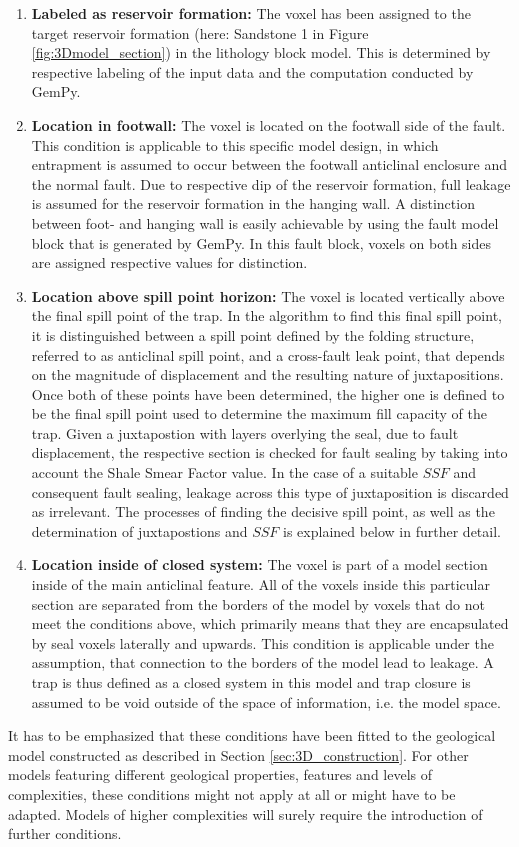 		\begin{enumerate}
			\item \textbf{Labeled as reservoir formation:} The voxel has been assigned to the target reservoir formation (here: Sandstone 1 in Figure \ref{fig:3Dmodel_section}) in the lithology block model. This is determined by respective labeling of the input data and the computation conducted by GemPy.
			\item \textbf{Location in footwall:} The voxel is located on the footwall side of the fault. This condition is applicable to this specific model design, in which entrapment is assumed to occur between the footwall anticlinal enclosure and the normal fault. Due to respective dip of the reservoir formation, full leakage is assumed for the reservoir formation in the hanging wall. A distinction between foot- and hanging wall is easily achievable by using the fault model block that is generated by GemPy. In this fault block, voxels on both sides are assigned respective values for distinction.
			\item \textbf{Location above spill point horizon:} The voxel is located vertically above the final spill point of the trap. In the algorithm to find this final spill point, it is distinguished between a spill point defined by the folding structure, referred to as anticlinal spill point, and a cross-fault leak point, that depends on the magnitude of displacement and the resulting nature of juxtapositions. Once both of these points have been determined, the higher one is defined to be the final spill point used to determine the maximum fill capacity of the trap.  Given a juxtapostion with layers overlying the seal, due to fault displacement, the respective section is checked for fault sealing by taking into account the Shale Smear Factor value. In the case of a suitable $SSF$ and consequent fault sealing, leakage across this type of juxtaposition is discarded as irrelevant. The processes of finding the decisive spill point, as well as the determination of juxtapostions and $SSF$ is explained below in further detail.
			\item \textbf{Location inside of closed system:} The voxel is part of a model section inside of the main anticlinal feature. All of the voxels inside this particular section are separated from the borders of the model by voxels that do not meet the conditions above, which primarily means that they are encapsulated by seal voxels laterally and upwards. This condition is applicable  under the assumption, that connection to the borders of the model lead to leakage. A trap is thus defined as a closed system in this model and trap closure is assumed to be void outside of the space of information, i.e. the model space.
			
		\end{enumerate}
		It has to be emphasized that these conditions have been fitted to the geological model constructed as described in Section \ref{sec:3D_construction}. For other models featuring different geological properties, features and levels of complexities, these conditions might not apply at all or might have to be adapted. Models of higher complexities will surely require the introduction of further conditions.
		
